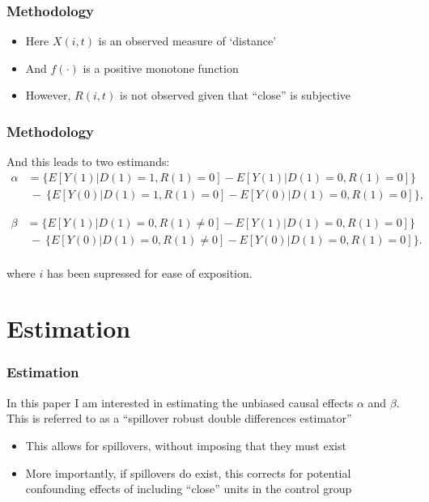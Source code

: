 \documentclass[10pt,letterpaper,subeqn]{beamer}
\begin{document}
\begin{frame}[label=method3]
  \frametitle{Methodology}
\begin{itemize}
\item Here $X(i,t)$ is an observed measure of `distance'
\item And $f(\cdot)$ is a positive monotone function
\item However, $R(i,t)$ is not observed given that ``close'' is subjective
\end{itemize}
\end{frame}


\begin{frame}[label=method4]
  \frametitle{Methodology}
And this leads to two estimands:
\begin{eqnarray}
\nonumber
\label{Seqn:DDa}
\alpha&=\{E[Y(1)|D(1)=1,R(1)=0]-E[Y(1)|D(1)=0,R(1)=0]\} \\ \nonumber
      &\ -\ \{E[Y(0)|D(1)=1,R(1)=0]-E[Y(0)|D(1)=0,R(1)=0]\}, 
\end{eqnarray}

\begin{eqnarray}
\nonumber
\beta&=\{E[Y(1)|D(1)=0,R(1)\neq 0]-E[Y(1)|D(1)=0,R(1)=0]\} \\ \nonumber
      &\ -\ \{E[Y(0)|D(1)=0,R(1)\neq 0]-E[Y(0)|D(1)=0,R(1)=0]\}. 
\end{eqnarray}
\vspace{3mm} \\
where $i$ has been supressed for ease of exposition.
\end{frame}

\section{Estimation}
\begin{frame}[label=estim1]
  \frametitle{Estimation}
In this paper I am interested in estimating the unbiased causal effects $\alpha$ 
and $\beta$.  This is referred to as a ``spillover robust double differences
estimator''
\vspace{4mm}
\begin{itemize}
\item This allows for spillovers, without imposing that they must exist
\item More importantly, if spillovers do exist, this corrects for potential 
confounding effects of including ``close'' units in the control group
\end{itemize}
\end{frame}
\end{document}
